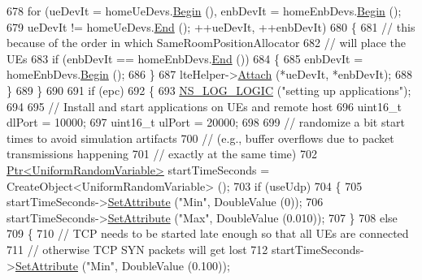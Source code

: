 \begin{DoxyCode}
678       \textcolor{keywordflow}{for} (ueDevIt = homeUeDevs.\hyperlink{classns3_1_1NetDeviceContainer_ad5aac47677fe7277e232bdec5b48a8fc}{Begin} (), enbDevIt = homeEnbDevs.\hyperlink{classns3_1_1NetDeviceContainer_ad5aac47677fe7277e232bdec5b48a8fc}{Begin} ();
679            ueDevIt != homeUeDevs.\hyperlink{classns3_1_1NetDeviceContainer_a8af596b06daf9613da60b4379861d770}{End} (); ++ueDevIt, ++enbDevIt)
680         \{
681           \textcolor{comment}{// this because of the order in which SameRoomPositionAllocator}
682           \textcolor{comment}{// will place the UEs}
683           \textcolor{keywordflow}{if} (enbDevIt == homeEnbDevs.\hyperlink{classns3_1_1NetDeviceContainer_a8af596b06daf9613da60b4379861d770}{End} ())
684             \{
685               enbDevIt = homeEnbDevs.\hyperlink{classns3_1_1NetDeviceContainer_ad5aac47677fe7277e232bdec5b48a8fc}{Begin} ();
686             \}
687           lteHelper->\hyperlink{classns3_1_1LteHelper_a9466743f826aa2652a87907b7f0a1c87}{Attach} (*ueDevIt, *enbDevIt);
688         \}
689     \}
690 
691   \textcolor{keywordflow}{if} (epc)
692     \{
693       \hyperlink{group__logging_ga88acd260151caf2db9c0fc84997f45ce}{NS\_LOG\_LOGIC} (\textcolor{stringliteral}{"setting up applications"});
694 
695       \textcolor{comment}{// Install and start applications on UEs and remote host}
696       uint16\_t dlPort = 10000;
697       uint16\_t ulPort = 20000;
698 
699       \textcolor{comment}{// randomize a bit start times to avoid simulation artifacts}
700       \textcolor{comment}{// (e.g., buffer overflows due to packet transmissions happening}
701       \textcolor{comment}{// exactly at the same time) }
702       \hyperlink{classns3_1_1Ptr}{Ptr<UniformRandomVariable>} startTimeSeconds = 
      CreateObject<UniformRandomVariable> ();
703       \textcolor{keywordflow}{if} (useUdp)
704         \{
705           startTimeSeconds->\hyperlink{classns3_1_1ObjectBase_ac60245d3ea4123bbc9b1d391f1f6592f}{SetAttribute} (\textcolor{stringliteral}{"Min"}, DoubleValue (0));
706           startTimeSeconds->\hyperlink{classns3_1_1ObjectBase_ac60245d3ea4123bbc9b1d391f1f6592f}{SetAttribute} (\textcolor{stringliteral}{"Max"}, DoubleValue (0.010));
707         \}
708       \textcolor{keywordflow}{else}
709         \{
710           \textcolor{comment}{// TCP needs to be started late enough so that all UEs are connected}
711           \textcolor{comment}{// otherwise TCP SYN packets will get lost}
712           startTimeSeconds->\hyperlink{classns3_1_1ObjectBase_ac60245d3ea4123bbc9b1d391f1f6592f}{SetAttribute} (\textcolor{stringliteral}{"Min"}, DoubleValue (0.100));

\end{DoxyCode}

